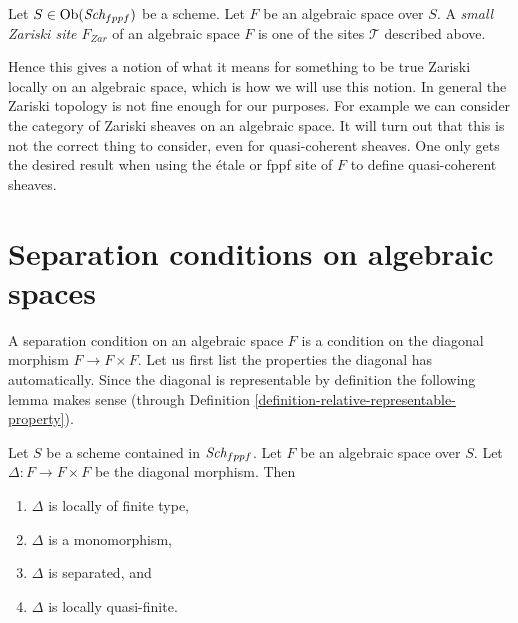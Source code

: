 \begin{definition}
\label{definition-small-Zariski-site}
Let $S \in \mathop{\rm Ob}\nolimits(\textit{Sch}_{fppf})$ be a scheme.
Let $F$ be an algebraic space over $S$. A {\it small Zariski site $F_{Zar}$} of
an algebraic space $F$ is one of the sites $\mathcal{T}$ described above.
\end{definition}

\noindent
Hence this gives a notion of what it means for something to be true
Zariski locally on an algebraic space, which is how we will use this
notion. In general the Zariski topology is not fine enough for our
purposes. For example we can consider the category of Zariski sheaves
on an algebraic space. It will turn out that this is not the
correct thing to consider, even for quasi-coherent sheaves.
One only gets the desired result when using the \'etale or fppf site of
$F$ to define quasi-coherent sheaves.











\section{Separation conditions on algebraic spaces}
\label{section-separation}

\noindent
A separation condition on an algebraic space $F$ is a condition
on the diagonal morphism $F \to F \times F$. Let us first
list the properties the diagonal has automatically.
Since the diagonal is representable by definition the following lemma
makes sense (through
Definition \ref{definition-relative-representable-property}).

\begin{lemma}
\label{lemma-properties-diagonal}
Let $S$ be a scheme contained in $\textit{Sch}_{fppf}$.
Let $F$ be an algebraic space over $S$.
Let $\Delta : F \to F \times F$ be the diagonal morphism.
Then
\begin{enumerate}
\item $\Delta$ is locally of finite type,
\item $\Delta$ is a monomorphism,
\item $\Delta$ is separated, and
\item $\Delta$ is locally quasi-finite.
\end{enumerate}
\end{lemma}

